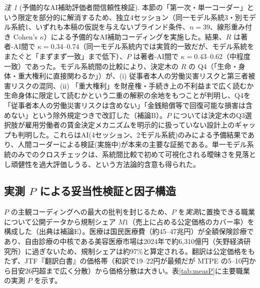 \documentclass[11pt]{article}
\theoremstyle{plain}
\theoremstyle{definition}
\theoremstyle{remark}
\newtheorem*{rmk}{注}
\begin{document}
\begin{rmk}[予備的なAI補助評価者間信頼性検証]
本節の「第一次・単一コーダー」という限定を部分的に解消するため、独立4セッション（同一モデル系統3・別モデル系統1、いずれも本稿の仮説を与えないブラインド条件、$n=39$、線形重み付き Cohen's $\kappa$）による予備的なAI補助コーディングを実施した。結果、$R$ は著者-AI間で $\kappa=0.34$--$0.74$（同一モデル系統内では実質的一致だが、モデル系統をまたぐと「まずまず一致」まで低下）、$P$ は著者-AI間で $\kappa=0.43$--$0.62$（中程度一致）であった。モデル系統間の比較により、決定木の $R$ の Q4（「生命・身体・重大権利に直接関わるか」）が、(i) 従事者本人の労働災害リスクと第三者被害リスクの混同、(ii) 「重大権利」を財産権・手続き上の不利益まで広く読むか生命身体に限定して読むかという二重の解釈の余地をもつことが判明し、Q4を「従事者本人の労働災害リスクは含めない」「金銭賠償等で回復可能な損害は含めない」という除外規定つきで改訂した（補論B）。$P$ については決定木のQ3選択肢が雇用労働者の賃金決定メカニズムを明示的に扱っていない設計上のギャップも判明した。これらはAI(4セッション、2モデル系統)のみによる予備結果であり、人間コーダーによる検証(実施中)が本来の主要な証拠である。単一モデル系統のみでのクロスチェックは、系統間比較で初めて可視化される曖昧さを見落とし頑健性を過大評価しうる、という方法論的含意も得られた。
\end{rmk}

\subsection{実測 $P$ による妥当性検証と因子構造}\label{sec:measured}
$P$ の主観コーディングへの最大の批判を封じるため、$P$ を\emph{実測}に置換できる職業について公開データから規制シェア $M1$（売上に占める公定価格のカバー率）を構成した（出典は補論E）。医療は国民医療費（約45--47兆円）が全額保険診療であり、自由診療の中核である美容医療市場は2024年で約6{,}310億円（矢野経済研究所）に過ぎないため、規制シェアは約97\%と算定される。翻訳は公定価格をもたず、JTF『翻訳白書』の価格帯（和訳で19--22円が最頻だが MTPE の5--10円から目安26円超まで広く分散）から価格分散は大きい。表\ref{tab:measP}に主要職業の実測 $P$ を示す。
\end{document}
